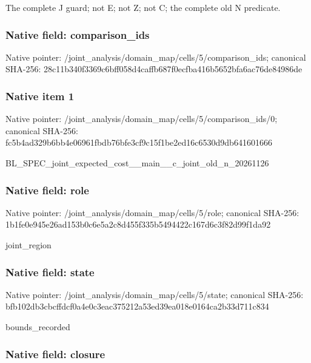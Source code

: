 \documentclass[10pt,a4paper]{article}
\begin{document}
The complete J guard; not E; not Z; not C; the complete old N predicate.


\subsubsection{Native field: comparison\_ids}


Native pointer: /joint\_analysis/domain\_m\allowbreak{}ap/cells/5/comparison\_id\allowbreak{}s; canonical SHA-256: 28c11b340f3369c6bff058d4\allowbreak{}caffb687f0ecfba416b5652b\allowbreak{}fa6ac76de84986de



\subsubsection{Native item 1}


Native pointer: /joint\_analysis/domain\_m\allowbreak{}ap/cells/5/comparison\_id\allowbreak{}s/0; canonical SHA-256: fc5b4ad329b6bb4e06961fbd\allowbreak{}b76bfe3cf9c15f1be2ed16c6\allowbreak{}530d9db641601666


BL\_SPEC\_joint\_expected\_c\allowbreak{}ost\_\_main\_\_c\_joint\_old\_n\allowbreak{}\_20261126


\subsubsection{Native field: role}


Native pointer: /joint\_analysis/domain\_map/cells/5/role; canonical SHA-256: 1b1fe0e945e26ad153b0c6e5\allowbreak{}a2c8d455f335b5494422c167\allowbreak{}d6c3f82d99f1da92


joint\_region


\subsubsection{Native field: state}


Native pointer: /joint\_analysis/domain\_m\allowbreak{}ap/cells/5/state; canonical SHA-256: bfb102db3cbcffdcf0a4e0c3\allowbreak{}eac375212a53ed39ea018e01\allowbreak{}64ca2b33d711c834


bounds\_recorded


\subsubsection{Native field: closure}
\end{document}
